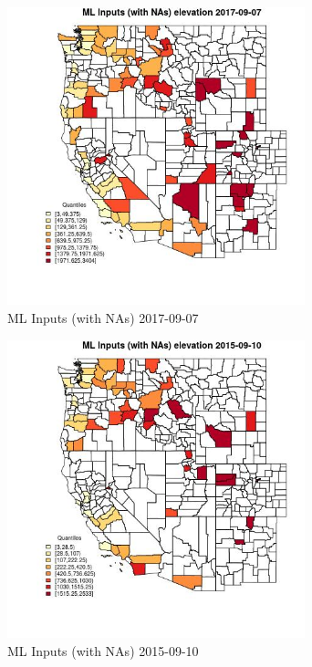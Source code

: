 \begin{figure} 
\centering  
\includegraphics[width=0.77\textwidth]{Code_Outputs/Report_ML_input_PM25_Step4_part_e_de_duplicated_aveswNAs_CountyelevationMean2017-09-07_2017-09-07.jpg} 
\caption{\label{fig:Report_ML_input_PM25_Step4_part_e_de_duplicated_aveswNAsCountyelevationMean2017-09-07_2017-09-07}ML Inputs (with NAs) 2017-09-07} 
\end{figure} 
 

\begin{figure} 
\centering  
\includegraphics[width=0.77\textwidth]{Code_Outputs/Report_ML_input_PM25_Step4_part_e_de_duplicated_aveswNAs_CountyelevationMean2015-09-10_2015-09-10.jpg} 
\caption{\label{fig:Report_ML_input_PM25_Step4_part_e_de_duplicated_aveswNAsCountyelevationMean2015-09-10_2015-09-10}ML Inputs (with NAs) 2015-09-10} 
\end{figure} 
 

